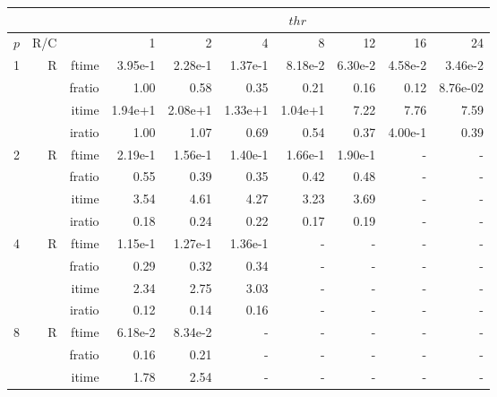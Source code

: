 \documentclass[a4paper]{article}
\begin{document}
\begin{table}[htbp]
\begin{center}
\begin{small}
\begin{tabular}{|r|r|r|r|r|r|r|r|r|r|}
\hline 
     & & & \multicolumn{7}{c|}{$thr$} \\ \hline
    $p$ & R/C &  & 1           & 2    & 4    & 8    & 12   & 16    & 24  \\ \hline\hline
   1 &  R &   ftime &    3.95e-1 &    2.28e-1 &    1.37e-1 &    8.18e-2 &    6.30e-2 &    4.58e-2 &    3.46e-2 \\
             &             &  fratio &    1.00 &    0.58 &    0.35 &   0.21 &    0.16 &   0.12 &    8.76e-02\\
             &             &  itime &    1.94e+1 &   2.08e+1 &   1.33e+1 &   1.04e+1 &   7.22  &    7.76  &    7.59  \\
             &             &  iratio &    1.00 &    1.07  &   0.69 &    0.54 &    0.37 &    4.00e-1 &    0.39 \\\hline
   2 &  R &   ftime &    2.19e-1 &    1.56e-1 &    1.40e-1 &    1.66e-1 &    1.90e-1 &      - &      - \\
             &             &  fratio &    0.55 &    0.39 &    0.35 &    0.42 &    0.48 &      - &      - \\
             &             &  itime &    3.54  &    4.61  &    4.27  &    3.23  &    3.69  &      - &      - \\
             &             &  iratio &    0.18 &    0.24 &    0.22 &    0.17 &    0.19 &      - &      - \\\hline
   4 &  R &   ftime &    1.15e-1 &    1.27e-1 &    1.36e-1 &      - &      - &      - &      - \\
             &             &  fratio &    0.29 &    0.32 &    0.34 &      - &      - &      - &      - \\
             &             &  itime &    2.34  &    2.75  &    3.03  &      - &      - &      - &      - \\
             &             &  iratio &    0.12 &    0.14 &    0.16 &      - &      - &      - &      - \\\hline
   8 &   R &   ftime &    6.18e-2 &    8.34e-2 &      - &      - &      - &      - &      - \\
             &             &  fratio &    0.16 &    0.21 &      - &      - &      - &      - &      - \\
             &             &  itime &    1.78  &    2.54  &      - &      - &      - &      - &      - \\

\end{tabular}
\end{small}
\end{center}
\end{table}
\end{document}
